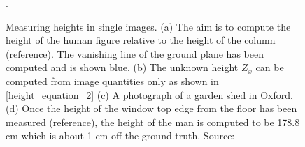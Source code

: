              \begin{figure}[h]
                \centering
                \qquad
                \qquad
                \qquad
                \caption{Measuring heights in single images. (a) The aim is to compute the height of the human figure relative to the height of the column (reference). The vanishing line of the ground plane has been computed and is shown blue. (b) The unknown height $Z_x$ can be computed from image quantities only as shown in \ref{height_equation_2} (c) A photograph of a garden shed in Oxford. (d) Once the height of the window top edge from the floor has been measured (reference), the height of the man is computed to be 178.8 cm which is about 1 cm off the ground truth. Source: \cite{criminisi2002single}}.
                \label{fig:height_estimation}
            \end{figure}